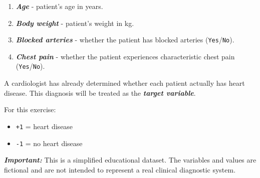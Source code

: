 \documentclass{course_sheet}
\begin{document}
\begin{enumerate}
\item
\textbf{\textit{Age}} - patient's age in years.

\item
\textbf{\textit{Body weight}} - patient's weight in kg.

\item
\textbf{\textit{Blocked arteries}} - whether the patient has blocked arteries (\texttt{Yes}/\texttt{No}).

\item
\textbf{\textit{Chest pain}} - whether the patient experiences characteristic chest pain (\texttt{Yes}/\texttt{No}).

\end{enumerate}
A cardiologist has already determined whether each patient actually has heart disease. This diagnosis will be treated as the \textbf{\textit{target variable}}.

For this exercise:

\begin{itemize}
\item
\texttt{+1} = heart disease

\item
\texttt{-1} = no heart disease

\end{itemize}
\textbf{\textit{Important:}} This is a simplified educational dataset. The variables and values are fictional and are not intended to represent a real clinical diagnostic system.
\end{document}
